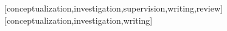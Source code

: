 \documentclass[spanish]{textolivre}
\begin{document}
\printbibliography\label{sec-bib}


\begin{contributors}
[conceptualization,investigation,supervision,writing,review]
[conceptualization,investigation,writing]
\end{contributors}
\end{document}

